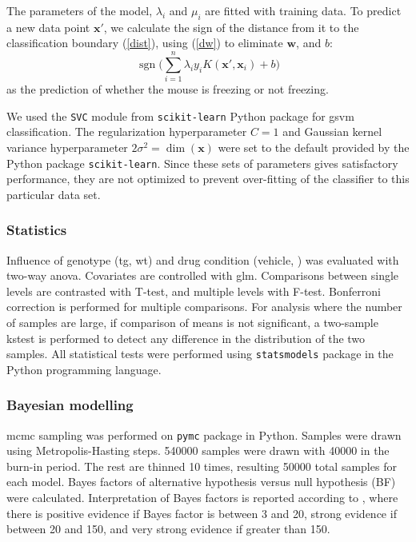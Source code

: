 The parameters of the model, $\lambda_i$ and $\mu_i$ are fitted with training data. To predict a new data point $\mathbf{x}'$, we calculate the sign of the distance from it to the classification boundary (\ref{dist}), using (\ref{dw}) to eliminate $\mathbf{w}$, and $b$:
\begin{equation*}
    \operatorname{sgn}\Big(\sum_{i=1}^n\lambda_iy_iK(\mathbf{x}', \mathbf{x}_i) + b\Big)
\end{equation*}
as the prediction of whether the mouse is freezing or not freezing.

We used the \texttt{SVC} module from \texttt{scikit-learn} Python package for \gls{gsvm} classification. The regularization hyperparameter $C=1$ and Gaussian kernel variance hyperparameter $2\sigma^2=\operatorname{dim}(\mathbf{x})$ were set to the default provided by the Python package \texttt{scikit-learn}. Since these sets of parameters gives satisfactory performance, they are not optimized to prevent over-fitting of the classifier to this particular data set.



\subsubsection{Statistics}

Influence of genotype (\gls{tg}, \gls{wt}) and drug condition (vehicle, \tglu) was evaluated with two-way \gls{anova}. Covariates are controlled with \gls{glm}. Comparisons between single levels are contrasted with T-test, and multiple levels with F-test. Bonferroni correction is performed for multiple comparisons. For analysis where the number of samples are large, if comparison of means is not significant, a two-sample \gls{kstest} is performed to detect any difference in the distribution of the two samples. All statistical tests were performed using \texttt{statsmodels} package in the Python programming language.

\subsubsection{Bayesian modelling}
\Gls{mcmc} sampling was performed on \texttt{pymc} package in Python. Samples were drawn using Metropolis-Hasting steps. \num{540000} samples were drawn with \num{40000} in the burn-in period. The rest are thinned \num{10} times, resulting \num{50000} total samples for each model. Bayes factors of alternative hypothesis versus null hypothesis (BF) were calculated. Interpretation of Bayes factors is reported according to \citet{kass95}, where there is positive evidence if Bayes factor is between 3 and 20, strong evidence if between 20 and 150, and very strong evidence if greater than 150.

